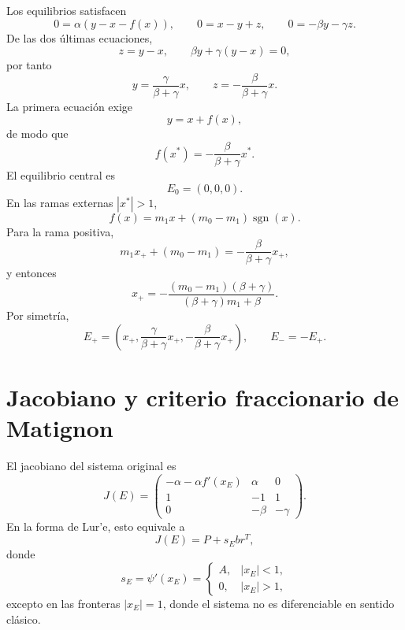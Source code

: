\documentclass[11pt]{article}
\newcommand{\sgn}{\operatorname{sgn}}
\begin{document}
Los equilibrios satisfacen
\begin{equation}
0=\alpha(y-x-f(x)),
\qquad
0=x-y+z,
\qquad
0=-\beta y-\gamma z.
\end{equation}
De las dos últimas ecuaciones,
\begin{equation}
z=y-x,
\qquad
\beta y+\gamma(y-x)=0,
\end{equation}
por tanto
\begin{equation}
y=\frac{\gamma}{\beta+\gamma}x,
\qquad
z=-\frac{\beta}{\beta+\gamma}x.
\label{eq:y_z_eq}
\end{equation}
La primera ecuación exige
\begin{equation}
y=x+f(x),
\end{equation}
de modo que
\begin{equation}
f(x^*)=-\frac{\beta}{\beta+\gamma}x^*.
\label{eq:eq_scalar}
\end{equation}
El equilibrio central es
\begin{equation}
E_0=(0,0,0).
\end{equation}
En las ramas externas \(|x^*|>1\),
\begin{equation}
f(x)=m_1x+(m_0-m_1)\sgn(x).
\end{equation}
Para la rama positiva,
\begin{equation}
m_1x_+ +(m_0-m_1)=-\frac{\beta}{\beta+\gamma}x_+,
\end{equation}
y entonces
\begin{equation}
x_+=-\frac{(m_0-m_1)(\beta+\gamma)}{(\beta+\gamma)m_1+\beta}.
\label{eq:xplus}
\end{equation}
Por simetría,
\begin{equation}
E_+=\left(x_+,\frac{\gamma}{\beta+\gamma}x_+,-\frac{\beta}{\beta+\gamma}x_+\right),
\qquad
E_-=-E_+.
\label{eq:equilibria_pm}
\end{equation}

\section{Jacobiano y criterio fraccionario de Matignon}

El jacobiano del sistema original es
\begin{equation}
J(E)=
\begin{pmatrix}
-\alpha-\alpha f'(x_E) & \alpha & 0\\
1&-1&1\\
0&-\beta&-\gamma
\end{pmatrix}.
\label{eq:jac_original}
\end{equation}
En la forma de Lur'e, esto equivale a
\begin{equation}
J(E)=P+s_E b r^T,
\label{eq:jac_lure}
\end{equation}
donde
\begin{equation}
s_E=\psi'(x_E)=
\begin{cases}
A, & |x_E|<1,\\
0, & |x_E|>1,
\end{cases}
\label{eq:slope_piecewise}
\end{equation}
excepto en las fronteras \(|x_E|=1\), donde el sistema no es diferenciable en sentido clásico.
\end{document}
